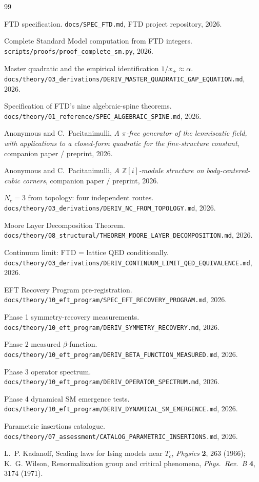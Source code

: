 \documentclass[11pt,letterpaper]{article}
\begin{document}

\begin{thebibliography}{99}

 FTD specification.
  \texttt{docs/SPEC\_FTD.md}, FTD project repository, 2026.

 Complete Standard Model computation from FTD integers.
  \texttt{scripts/proofs/proof\_complete\_sm.py}, 2026.

 Master quadratic and the empirical
  identification $1/x_+ \approx \alpha$.
  \texttt{docs/theory/03\_derivations/DERIV\_MASTER\_QUADRATIC\_GAP\_EQUATION.md}, 2026.

 Specification of FTD's nine algebraic-spine theorems.
  \texttt{docs/theory/01\_reference/SPEC\_ALGEBRAIC\_SPINE.md}, 2026.

 Anonymous and C.\ Pacitanimulli,
  \textit{A $\pi$-free generator of the lemniscatic field, with
  applications to a closed-form quadratic for the fine-structure constant},
  companion paper / preprint, 2026.

 Anonymous and C.\ Pacitanimulli,
  \textit{A $\mathbb{Z}[i]$-module structure on body-centered-cubic
  corners}, companion paper / preprint, 2026.

 $N_c = 3$ from topology: four independent routes.
  \texttt{docs/theory/03\_derivations/DERIV\_NC\_FROM\_TOPOLOGY.md}, 2026.

 Moore Layer Decomposition Theorem.
  \texttt{docs/theory/08\_structural/THEOREM\_MOORE\_LAYER\_DECOMPOSITION.md}, 2026.

 Continuum limit: FTD = lattice QED conditionally.
  \texttt{docs/theory/03\_derivations/DERIV\_CONTINUUM\_LIMIT\_QED\_EQUIVALENCE.md}, 2026.

 EFT Recovery Program pre-registration.
  \texttt{docs/theory/10\_eft\_program/SPEC\_EFT\_RECOVERY\_PROGRAM.md}, 2026.

 Phase 1 symmetry-recovery measurements.
  \texttt{docs/theory/10\_eft\_program/DERIV\_SYMMETRY\_RECOVERY.md}, 2026.

 Phase 2 measured $\beta$-function.
  \texttt{docs/theory/10\_eft\_program/DERIV\_BETA\_FUNCTION\_MEASURED.md}, 2026.

 Phase 3 operator spectrum.
  \texttt{docs/theory/10\_eft\_program/DERIV\_OPERATOR\_SPECTRUM.md}, 2026.

 Phase 4 dynamical SM emergence tests.
  \texttt{docs/theory/10\_eft\_program/DERIV\_DYNAMICAL\_SM\_EMERGENCE.md}, 2026.

 Parametric insertions catalogue.
  \texttt{docs/theory/07\_assessment/CATALOG\_PARAMETRIC\_INSERTIONS.md}, 2026.

 L.~P. Kadanoff, Scaling laws for Ising models near $T_c$,
  \emph{Physics} \textbf{2}, 263 (1966); K.~G. Wilson, Renormalization group
  and critical phenomena, \emph{Phys.\ Rev.\ B} \textbf{4}, 3174 (1971).

\end{thebibliography}
\end{document}
